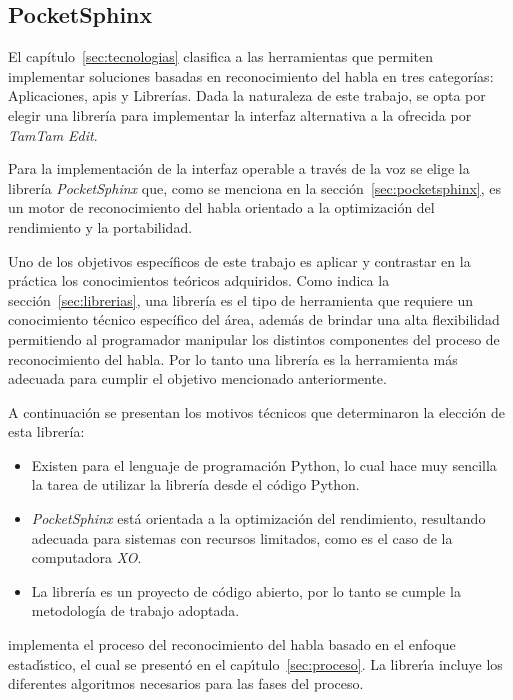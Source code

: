 \subsection{PocketSphinx}

El cap\'itulo~\ref{sec:tecnologias} clasifica a las herramientas que permiten implementar soluciones
basadas en reconocimiento del habla en tres categor\'ias: Aplicaciones, \gls{api}s y Librer\'ias. Dada la naturaleza
de este trabajo, se opta por elegir una librer\'ia para implementar la interfaz alternativa a la ofrecida por
\emph{TamTam Edit}.

Para la implementaci\'on de la interfaz operable a trav\'es de la voz se elige la librer\'ia \emph{PocketSphinx}
que, como se menciona en la secci\'on~\ref{sec:pocketsphinx}, es un motor de reconocimiento del habla orientado a la
optimizaci\'on del rendimiento y la portabilidad.

Uno de los objetivos espec\'ificos de este trabajo es aplicar y contrastar en la pr\'actica
los conocimientos te\'oricos adquiridos. Como indica la secci\'on~\ref{sec:librerias}, una librer\'ia es
el tipo de herramienta que requiere un conocimiento t\'ecnico espec\'ifico del \'area, adem\'as de
brindar una alta flexibilidad permitiendo al programador manipular los distintos componentes del
proceso de reconocimiento del habla. Por lo tanto una librer\'ia es la herramienta m\'as adecuada
para cumplir el objetivo mencionado anteriormente.

A continuaci\'on se presentan los motivos t\'ecnicos que determinaron la elecci\'on de esta librer\'ia:

\begin{itemize}
    \item Existen  para el lenguaje de programaci\'on Python, lo cual hace muy sencilla la 
    tarea de utilizar la librer\'ia desde el c\'odigo Python.
    \item \emph{PocketSphinx} est\'a orientada a la optimizaci\'on del rendimiento, resultando adecuada 
    para sistemas con recursos limitados, como es el caso de la computadora \emph{XO}.
    \item La librer\'ia es un proyecto de c\'odigo abierto, por lo tanto se cumple la metodolog\'ia 
    de trabajo adoptada.
\end{itemize}

 implementa el proceso del reconocimiento del habla basado en el enfoque estad{\'\i}stico,
el cual se present\'o en el cap{\'\i}tulo~\ref{sec:proceso}. La librer{\'\i}a incluye los diferentes algoritmos necesarios
para las fases del proceso.

